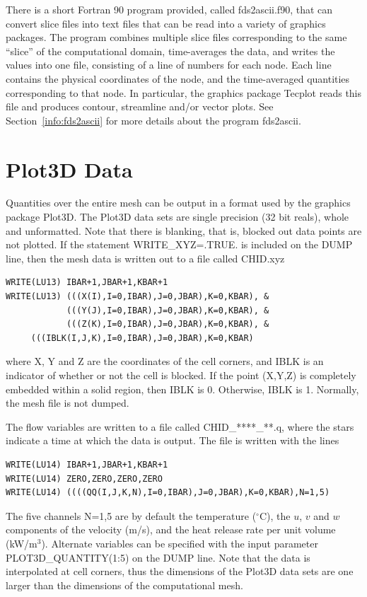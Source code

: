 \documentclass[11pt]{book}
\begin{document}
There is a short Fortran 90 program provided, called {\ct fds2ascii.f90}, that can convert slice files into text files that can be read into a variety of graphics packages. The program combines multiple slice files corresponding to the same ``slice'' of the computational domain, time-averages the data, and writes the values into one file, consisting of a line of numbers for each node. Each line contains the physical coordinates of the node, and the time-averaged quantities corresponding to that node. In particular, the graphics package Tecplot reads this file and produces contour, streamline and/or vector plots. See Section~\ref{info:fds2ascii} for more details about the program {\ct fds2ascii}.

\section{Plot3D Data}
\label{out:PL3D}

Quantities over the entire mesh can be output in a format used by the graphics package Plot3D. The Plot3D data sets are single precision (32 bit reals), whole and unformatted. Note that there is blanking, that is, blocked out data points are not plotted. If the statement {\ct WRITE\_XYZ=.TRUE.} is included on the {\ct DUMP} line, then the mesh data is written out to a file called {\ct CHID.xyz}
\begin{lstlisting}
WRITE(LU13) IBAR+1,JBAR+1,KBAR+1
WRITE(LU13) (((X(I),I=0,IBAR),J=0,JBAR),K=0,KBAR), &
            (((Y(J),I=0,IBAR),J=0,JBAR),K=0,KBAR), &
            (((Z(K),I=0,IBAR),J=0,JBAR),K=0,KBAR), &
     (((IBLK(I,J,K),I=0,IBAR),J=0,JBAR),K=0,KBAR)
\end{lstlisting}
where {\ct X, Y} and {\ct Z} are the coordinates of the cell corners, and {\ct IBLK} is an indicator of whether or not the cell is blocked. If the point ({\ct X,Y,Z}) is completely embedded within a solid region, then {\ct IBLK} is 0. Otherwise, {\ct IBLK} is 1. Normally, the mesh file is not dumped.

The flow variables are written to a file called {\ct CHID\_****\_**.q}, where the stars indicate a time at which the data is output. The file is written with the lines
\begin{lstlisting}
WRITE(LU14) IBAR+1,JBAR+1,KBAR+1
WRITE(LU14) ZERO,ZERO,ZERO,ZERO
WRITE(LU14) ((((QQ(I,J,K,N),I=0,IBAR),J=0,JBAR),K=0,KBAR),N=1,5)
\end{lstlisting}
The five channels {\ct N=1,5} are by default the temperature ($^\circ$C), the $u$, $v$ and $w$ components of the velocity (m/s), and the heat release rate per unit volume (kW/m$^3$). Alternate variables can be specified with the input parameter {\ct PLOT3D\_QUANTITY(1:5)} on the {\ct DUMP} line. Note that the data is interpolated at cell corners, thus the dimensions of the Plot3D data sets are one larger than the dimensions of the computational mesh.
\end{document}

